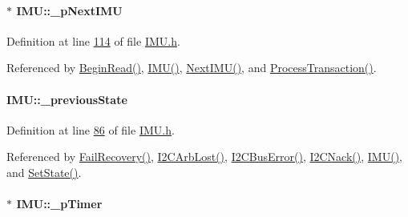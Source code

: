 \hypertarget{class_i_m_u_a72d5aa462d6627b458db76ca6567d130}{
\paragraph[{\_\-pNextIMU}]{$\ast$ {\bf IMU::\_\-pNextIMU}}\hfill}
\label{class_i_m_u_a72d5aa462d6627b458db76ca6567d130}


Definition at line \hyperlink{_i_m_u_8h_source_l00114}{114} of file \hyperlink{_i_m_u_8h_source}{IMU.h}.



Referenced by \hyperlink{_i_m_u_8cpp_source_l00108}{BeginRead()}, \hyperlink{_i_m_u_8cpp_source_l00020}{IMU()}, \hyperlink{_i_m_u_8cpp_source_l00103}{NextIMU()}, and \hyperlink{_i_m_u_8cpp_source_l00348}{ProcessTransaction()}.

\hypertarget{class_i_m_u_aca284ca1bcf10458005d4ca630833ea9}{
\paragraph[{\_\-previousState}]{ {\bf IMU::\_\-previousState}}\hfill}
\label{class_i_m_u_aca284ca1bcf10458005d4ca630833ea9}


Definition at line \hyperlink{_i_m_u_8h_source_l00086}{86} of file \hyperlink{_i_m_u_8h_source}{IMU.h}.



Referenced by \hyperlink{_i_m_u_8cpp_source_l00398}{FailRecovery()}, \hyperlink{_i_m_u_8cpp_source_l00534}{I2CArbLost()}, \hyperlink{_i_m_u_8cpp_source_l00499}{I2CBusError()}, \hyperlink{_i_m_u_8cpp_source_l00463}{I2CNack()}, \hyperlink{_i_m_u_8cpp_source_l00020}{IMU()}, and \hyperlink{_i_m_u_8h_source_l00178}{SetState()}.

\hypertarget{class_i_m_u_a16e73b1457a346aed16d4b61fae7f2c4}{
\paragraph[{\_\-pTimer}]{$\ast$ {\bf IMU::\_\-pTimer}}\hfill}
\label{class_i_m_u_a16e73b1457a346aed16d4b61fae7f2c4}


